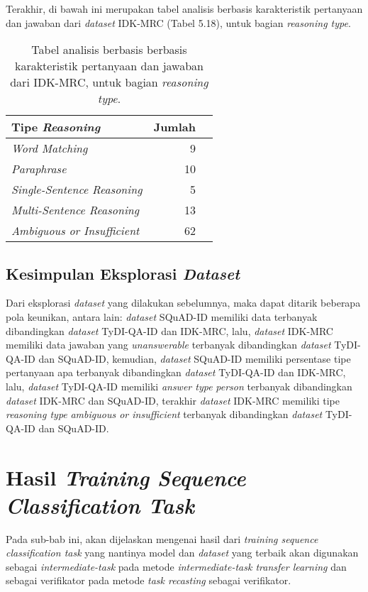 Terakhir, di bawah ini merupakan tabel analisis berbasis karakteristik pertanyaan dan jawaban dari \emph{dataset} IDK-MRC (Tabel 5.18), untuk bagian \emph{reasoning type}.

\begin{table}[H]\centering
\begin{tabular}{lrr}\toprule
Tipe \emph{Reasoning} &Jumlah \\\midrule
\emph{Word Matching} & 9\\
\emph{Paraphrase} & 10\\
\emph{Single-Sentence Reasoning} & 5\\
\emph{Multi-Sentence Reasoning} & 13\\
\emph{Ambiguous or Insufficient} & 62\\
\bottomrule
\end{tabular}
\caption{Tabel analisis berbasis berbasis karakteristik pertanyaan dan jawaban dari IDK-MRC, untuk bagian \emph{reasoning type}.}
\end{table}

\subsection{Kesimpulan Eksplorasi \emph{Dataset}}
Dari eksplorasi \emph{dataset} yang dilakukan sebelumnya, maka dapat ditarik beberapa pola keunikan, antara lain: \emph{dataset} SQuAD-ID memiliki data terbanyak dibandingkan \emph{dataset} TyDI-QA-ID dan IDK-MRC, lalu, \emph{dataset} IDK-MRC memiliki data jawaban yang \emph{unanswerable} terbanyak dibandingkan \emph{dataset} TyDI-QA-ID dan SQuAD-ID, kemudian, \emph{dataset} SQuAD-ID memiliki persentase tipe pertanyaan apa terbanyak dibandingkan \emph{dataset} TyDI-QA-ID dan IDK-MRC, lalu, \emph{dataset} TyDI-QA-ID memiliki \emph{answer type} \emph{person} terbanyak dibandingkan \emph{dataset} IDK-MRC dan SQuAD-ID, terakhir \emph{dataset} IDK-MRC memiliki tipe \emph{reasoning type} \emph{ambiguous or insufficient} terbanyak dibandingkan \emph{dataset} TyDI-QA-ID dan SQuAD-ID.

\section{Hasil \emph{Training Sequence Classification Task}}
\label{5.2}
Pada sub-bab ini, akan dijelaskan mengenai hasil dari \emph{training sequence classification task} yang nantinya model dan \emph{dataset} yang terbaik akan digunakan sebagai \emph{intermediate-task} pada metode \emph{intermediate-task transfer learning} dan sebagai verifikator pada metode \emph{task recasting} sebagai verifikator.

